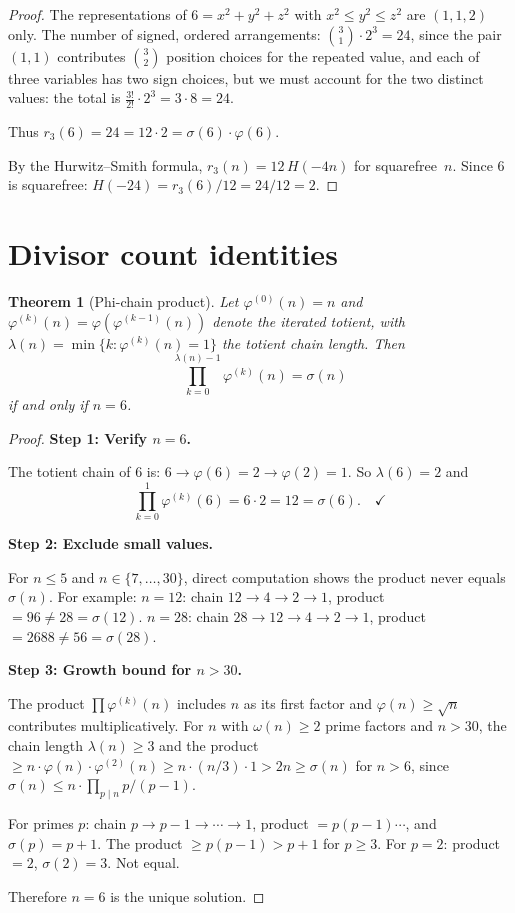 \documentclass[11pt]{amsart}
\newtheorem{theorem}{Theorem}
\theoremstyle{remark}
\begin{document}
\begin{proof}
The representations of $6 = x^2 + y^2 + z^2$ with $x^2 \leq y^2 \leq z^2$
are $(1, 1, 2)$ only.
The number of signed, ordered arrangements:
$\binom{3}{1} \cdot 2^3 = 24$, since the pair $(1,1)$ contributes
$\binom{3}{2}$ position choices for the repeated value, and each of
three variables has two sign choices, but we must account for the
two distinct values: the total is $\frac{3!}{2!} \cdot 2^3 = 3 \cdot 8 = 24$.

Thus $r_3(6) = 24 = 12 \cdot 2 = \sigma(6) \cdot \varphi(6)$.

By the Hurwitz--Smith formula, $r_3(n) = 12\,H(-4n)$ for squarefree~$n$.
Since $6$ is squarefree: $H(-24) = r_3(6)/12 = 24/12 = 2$.
\end{proof}

\section{Divisor count identities}

\begin{theorem}[Phi-chain product]\label{thm:phi-chain}
Let $\varphi^{(0)}(n) = n$ and $\varphi^{(k)}(n) = \varphi(\varphi^{(k-1)}(n))$
denote the iterated totient, with $\lambda(n) = \min\{k : \varphi^{(k)}(n) = 1\}$
the totient chain length. Then
\[
  \prod_{k=0}^{\lambda(n)-1} \varphi^{(k)}(n) = \sigma(n)
\]
if and only if $n = 6$.
\end{theorem}

\begin{proof}
\textbf{Step 1: Verify $n = 6$.}

The totient chain of $6$ is: $6 \to \varphi(6) = 2 \to \varphi(2) = 1$.
So $\lambda(6) = 2$ and
\[
  \prod_{k=0}^{1} \varphi^{(k)}(6) = 6 \cdot 2 = 12 = \sigma(6). \quad\checkmark
\]

\textbf{Step 2: Exclude small values.}

For $n \leq 5$ and $n \in \{7, \ldots, 30\}$, direct computation shows
the product never equals $\sigma(n)$.
For example:
$n = 12$: chain $12 \to 4 \to 2 \to 1$, product $= 96 \neq 28 = \sigma(12)$.
$n = 28$: chain $28 \to 12 \to 4 \to 2 \to 1$, product $= 2688 \neq 56 = \sigma(28)$.

\textbf{Step 3: Growth bound for $n > 30$.}

The product $\prod \varphi^{(k)}(n)$ includes $n$ as its first factor
and $\varphi(n) \geq \sqrt{n}$ contributes multiplicatively.
For $n$ with $\omega(n) \geq 2$ prime factors and $n > 30$,
the chain length $\lambda(n) \geq 3$ and the product
$\geq n \cdot \varphi(n) \cdot \varphi^{(2)}(n) \geq n \cdot (n/3) \cdot 1 > 2n \geq \sigma(n)$
for $n > 6$, since $\sigma(n) \leq n \cdot \prod_{p \mid n} p/(p-1)$.

For primes $p$: chain $p \to p-1 \to \cdots \to 1$, product $= p(p-1)\cdots$,
and $\sigma(p) = p + 1$. The product $\geq p(p-1) > p + 1$ for $p \geq 3$.
For $p = 2$: product $= 2$, $\sigma(2) = 3$. Not equal.

Therefore $n = 6$ is the unique solution.
\end{proof}
\end{document}
